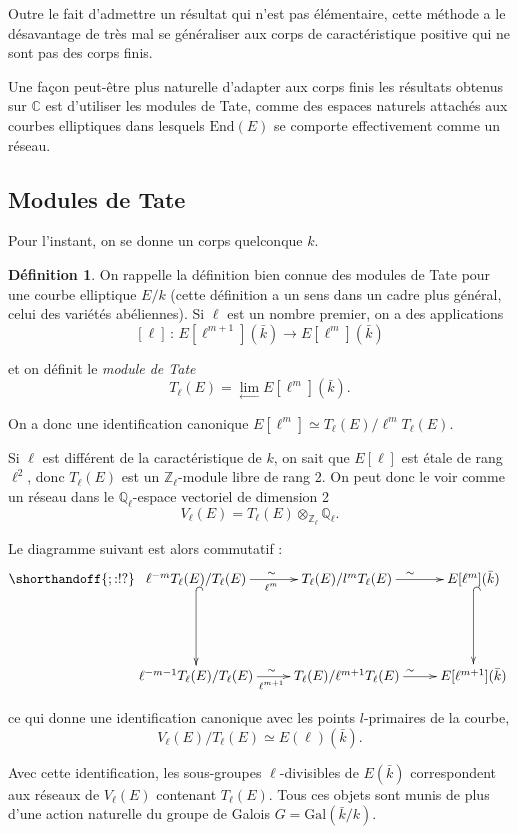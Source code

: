 \documentclass[11pt,a4paper]{article}
\newcommand{\Z}{\mathbb{Z}}
\newcommand{\C}{\mathbb{C}}
\newcommand{\Q}{\mathbb{Q}}
\newcommand{\vers}{\rightarrow}
\newcommand{\End}{\mathrm{End}}
\newcommand{\de}{\,:\,}
\theoremstyle{definition}
\newtheorem*{defi}{Définition}
\begin{document}
Outre le fait d'admettre un résultat qui n'est pas élémentaire, cette méthode a le désavantage de très mal se généraliser aux corps de caractéristique positive qui ne sont pas des corps finis.

Une façon peut-être plus naturelle d'adapter aux corps finis les résultats obtenus sur $\C$ est d'utiliser les modules de Tate, comme des espaces naturels attachés aux courbes elliptiques dans lesquels $\End(E)$ se comporte effectivement comme un réseau.




\newpage

\subsection{Modules de Tate}


Pour l'instant, on se donne un corps quelconque $k$.

\begin{defi}

On rappelle la définition bien connue des modules de Tate pour une courbe elliptique $E/k$ (cette définition a un sens dans un cadre plus général, celui des variétés abéliennes). Si $\ell$ est un nombre premier, on a des applications
$$ [\ell] \de E[\ell^{m+1}](\bar{k})\vers E[\ell^{m}](\bar{k})$$

et on définit le \emph{module de Tate}
$$T_\ell(E) = \lim_{\leftarrow} E[\ell^m](\bar{k}).$$

On a donc une identification canonique $E[\ell^m]\simeq T_\ell(E)/ \ell^{m} T_\ell(E)$.

Si $\ell$ est différent de la caractéristique de $k$, on sait que $E[\ell]$ est étale de rang $\ell^2$, donc $T_\ell(E)$ est un $\Z_\ell$-module libre de rang 2. On peut donc le voir comme un réseau dans le $\Q_\ell$-espace vectoriel de dimension 2
$$V_\ell(E) = T_\ell(E) \otimes_{\Z_\ell} \Q_\ell.$$

Le diagramme suivant est alors commutatif :
$$
\shorthandoff{;:!?}
\xymatrix {
\ell^{-m} T_\ell(E)/ T_\ell(E) \ar[r]_{\ell^m}^{\sim} \ar@{^{(}->}[dd]&
 T_\ell(E)/ l^m T_\ell(E) \ar[r]^{\sim}  & 
 E[\ell^m](\bar{k}) \ar@{^{(}->}[dd] \\ 
 \\
 \ell^{-m-1} T_\ell(E)/ T_\ell(E) \ar[r]_{\ell^{m+1}}^{\sim} &
 T_\ell(E)/ \ell^{m+1} T_\ell(E) \ar[r]^{\sim}  & 
 E[\ell^{m+1}](\bar{k})
}
$$

ce qui donne une identification canonique avec les points $l$-primaires de la courbe,
$$ V_\ell(E)/ T_\ell(E) \simeq E(\ell)(\bar{k}).$$

Avec cette identification, les sous-groupes $\ell$-divisibles de $E(\bar{k})$ correspondent aux réseaux de $V_\ell(E)$ contenant $T_\ell(E)$. Tous ces objets sont munis de plus d'une action naturelle du groupe de Galois $G= \mathrm{Gal}(\bar{k}/k)$.

\end{defi}
\end{document}
